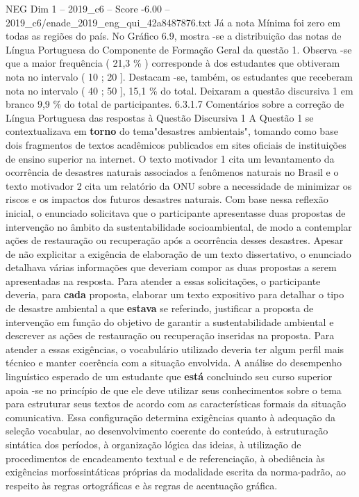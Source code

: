 \begin{textsample}{NEG Dim 1 – 2019\_c6 – Score -6.00 – 2019\_c6/enade\_2019\_eng\_qui\_42a8487876.txt}
Já a nota Mínima foi zero em todas as regiões do país.
No Gráfico 6.9, mostra -se a distribuição das notas de Língua Portuguesa do Componente de Formação Geral da questão 1.
Observa -se que a maior frequência ( 21,3 \% ) corresponde à dos estudantes que obtiveram nota no intervalo ( 10 ; 20 ].
Destacam -se, também, os estudantes que receberam nota no intervalo ( 40 ; 50 ], 15,1 \% do total.
Deixaram a questão discursiva 1 em branco 9,9 \% do total de participantes. 6.3.1.7 Comentários sobre a correção de Língua Portuguesa das respostas à Questão Discursiva 1 A Questão 1 se contextualizava em \textbf{torno} do tema"desastres ambientais", tomando como base dois fragmentos de textos acadêmicos publicados em sites oficiais de instituições de ensino superior na internet.
O texto motivador 1 cita um levantamento da ocorrência de desastres naturais associados a fenômenos naturais no Brasil e o texto motivador 2 cita um relatório da ONU sobre a necessidade de minimizar os riscos e os impactos dos futuros desastres naturais.
Com base nessa reflexão inicial, o enunciado solicitava que o participante apresentasse duas propostas de intervenção no âmbito da sustentabilidade socioambiental, de modo a contemplar ações de restauração ou recuperação após a ocorrência desses desastres.
Apesar de não explicitar a exigência de elaboração de um texto dissertativo, o enunciado detalhava várias informações que deveriam compor as duas propostas a serem apresentadas na resposta.
Para atender a essas solicitações, o participante deveria, para \textbf{cada} proposta, elaborar um texto expositivo para detalhar o tipo de desastre ambiental a que \textbf{estava} se referindo, justificar a proposta de intervenção em função do objetivo de garantir a sustentabilidade ambiental e descrever as ações de restauração ou recuperação inseridas na proposta.
Para atender a essas exigências, o vocabulário utilizado deveria ter algum perfil mais técnico e manter coerência com a situação envolvida.
A análise do desempenho linguístico esperado de um estudante que \textbf{está} concluindo seu curso superior apoia -se no princípio de que ele deve utilizar seus conhecimentos sobre o tema para estruturar seus textos de acordo com as características formais da situação comunicativa.
Essa configuração determina exigências quanto à adequação da seleção vocabular, ao desenvolvimento coerente do conteúdo, à estruturação sintática dos períodos, à organização lógica das ideias, à utilização de procedimentos de encadeamento textual e de referenciação, à obediência às exigências morfossintáticas próprias da modalidade escrita da norma-padrão, ao respeito às regras ortográficas e às regras de acentuação gráfica.

\end{textsample}
